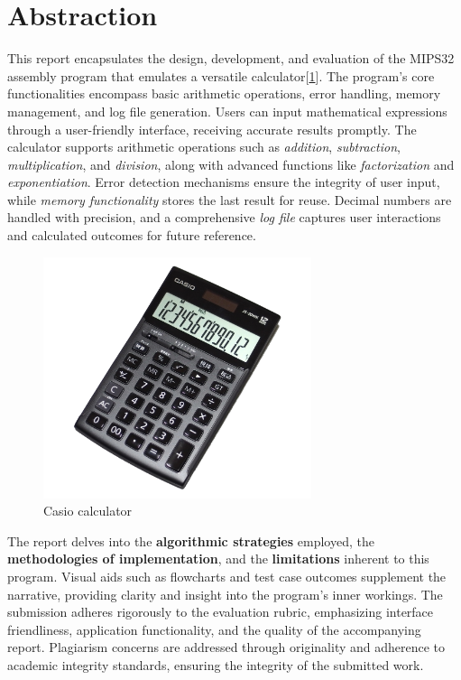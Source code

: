 \setcounter{section}{-1}
    \section{Abstraction}
        
This report encapsulates the design, development, and evaluation of the MIPS32 assembly program that emulates a versatile calculator[\ref{fig:CasioCalculator}]. The program's core functionalities encompass basic arithmetic operations, error handling, memory management, and log file generation. Users can input mathematical expressions through a user-friendly interface, receiving accurate results promptly. The calculator supports arithmetic operations such as \emph{addition}, \emph{subtraction}, \emph{multiplication}, and \emph{division}, along with advanced functions like \emph{factorization} and \emph{exponentiation}. Error detection mechanisms ensure the integrity of user input, while \emph{memory functionality} stores the last result for reuse. Decimal numbers are handled with precision, and a comprehensive \emph{log file} captures user interactions and calculated outcomes for future reference. 

\begin{figure}[htbp]
  \centering
  \includegraphics[width=0.7\textwidth]{graphics/0.CasioCalculator.jpg}
  \caption{Casio calculator}
  \label{fig:CasioCalculator}
\end{figure}

The report delves into the \textbf{algorithmic strategies} employed, the \textbf{methodologies of implementation}, and the \textbf{limitations} inherent to this program.
Visual aids such as flowcharts and test case outcomes supplement the narrative, providing clarity and insight into the program's inner workings. The submission adheres rigorously to the evaluation rubric, emphasizing interface friendliness, application functionality, and the quality of the accompanying report. Plagiarism concerns are addressed through originality and adherence to academic integrity standards, ensuring the integrity of the submitted work.
